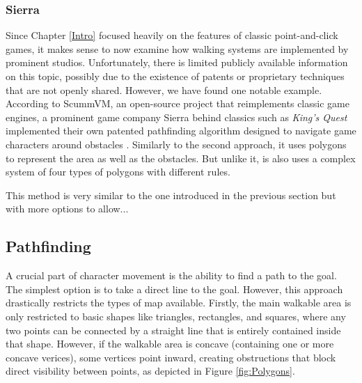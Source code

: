 \subsubsection{Sierra}
Since Chapter \ref{Intro} focused heavily on the features of classic point-and-click games, it makes sense to now examine how walking systems are implemented by prominent studios. Unfortunately, there is limited publicly available information on this topic, possibly due to the existence of patents or proprietary techniques that are not openly shared. However, we have found one notable example. According to ScummVM, an open-source project that reimplements classic game engines, a prominent game company Sierra behind classics such as \textit{King's Quest} implemented their own patented pathfinding algorithm designed to navigate game characters around obstacles \cite{ScummVM-polygons}. Similarly to the second approach, it uses polygons to represent the area as well as the obstacles. But unlike it, is also uses a complex system of four types of polygons with different rules. 

This method is very similar to the one introduced in the previous section but with more options to allow...

\subsection{Pathfinding}
A crucial part of character movement is the ability to find a path to the goal. The simplest option is to take a direct line to the goal. However, this approach drastically restricts the types of map available. Firstly, the main walkable area is only restricted to basic shapes like triangles, rectangles, and squares, where any two points can be connected by a straight line that is entirely contained inside that shape. However, if the walkable area is concave (containing one or more concave verices), some vertices point inward, creating obstructions that block direct visibility between points, as depicted in Figure \ref{fig:Polygons}.

